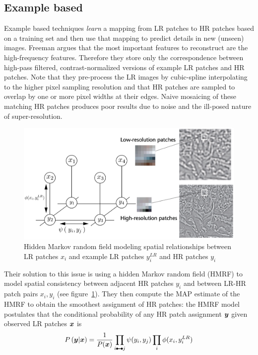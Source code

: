 \subsection{Example based}\label{subsec:example-based}

Example based techniques \textit{learn} a mapping from
LR patches to HR patches based on a training set and then use that mapping to predict details in new (unseen) images.
%
Freeman \etal\cite{freeman2002example} argues that the most important features to reconstruct are the high-frequency features.
%
Therefore they store only the correspondence between high-pass filtered, contrast-normalized versions of example LR patches and HR patches.
%
Note that they pre-process the LR images by cubic-spline interpolating to the higher pixel sampling resolution and that HR patches are sampled to overlap by one or more pixel widths at their edges.
%
Naive mosaicing of these matching HR patches produces poor results due to noise and the ill-posed nature of super-resolution.
%
\begin{figure}
    \centering
    \includegraphics[width=\linewidth,keepaspectratio]{figures/mrf.png}
    \caption{Hidden Markov random field modeling spatial relationships between LR patches $x_i$ and example LR patches $y_i^{LR}$ and HR patches $y_i$\cite{freeman2002example}}
    \label{fig:mrf}
\end{figure}
Their solution to this issue is using a hidden Markov random field (HMRF) to model spatial consistency between adjacent HR patches $y_i$ and between LR-HR patch pairs $x_i, y_i$ (see figure~\ref{fig:mrf}).
%
They then compute the MAP estimate of the HMRF to obtain the smoothest assignment of HR patches: the HMRF model postulates that the conditional probability of any HR patch assignment $\bm{y}$ given observed LR patches $\bm{x}$ is
\begin{equation}
    P\left( \by \middle| \bx \right) = \frac{1}{P(\bx)} \prod_{i\ue{} j} \psi(y_i, y_j) \prod_i \phi(x_i, y_i^{LR})
\end{equation}

